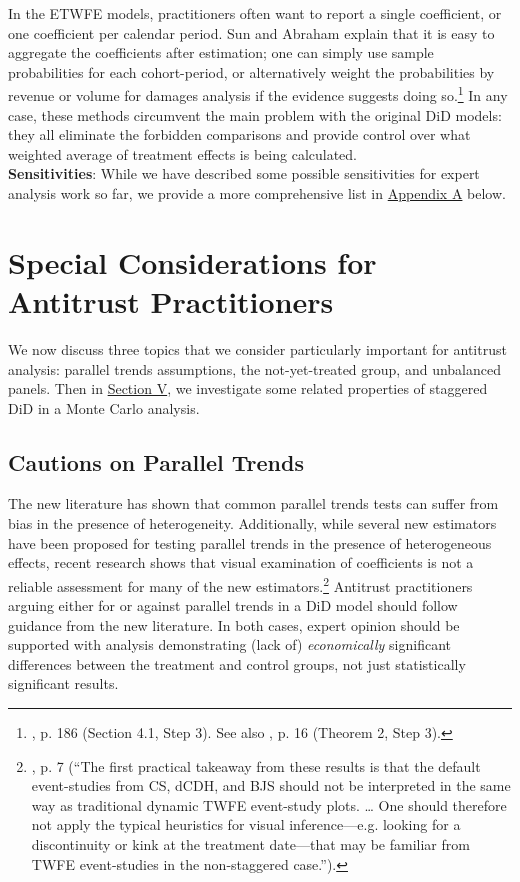 \documentclass[12pt]{article}
\begin{document}
In the ETWFE models, practitioners often want to report a single coefficient, or one coefficient per calendar period. Sun and Abraham explain that it is easy to aggregate the coefficients after estimation; one can simply use sample probabilities for each cohort-period, or alternatively weight the probabilities by revenue or volume for damages analysis if the evidence suggests doing so.\footnote{\citet{sunabr2021a}, p. 186 (Section 4.1, Step 3). See also \citet{borusyak2024revisiting}, p. 16 (Theorem 2, Step 3).}  In any case, these methods circumvent the main problem with the original DiD models: they all eliminate the forbidden comparisons and provide control over what weighted average of treatment effects is being calculated.
\\
\textbf{Sensitivities}: While we have described some possible sensitivities for expert analysis work so far, we provide a more comprehensive list in  \hyperref[sec:appendixa]{Appendix A} below.
\section{Special Considerations for Antitrust Practitioners} \label{sec:antitrust}
We now discuss three topics that we consider particularly important for antitrust analysis: parallel trends assumptions, the not-yet-treated group, and unbalanced panels. Then in  \hyperref[sec:analysis]{Section V}, we investigate some related properties of staggered DiD in a Monte Carlo analysis.
\subsection{Cautions on Parallel Trends} \label{sec:parallel-trends}
The new literature has shown that common parallel trends tests can suffer from bias in the presence of heterogeneity. Additionally, while several new estimators have been proposed for testing parallel trends in the presence of heterogeneous effects, recent research shows that visual examination of coefficients is not a reliable assessment for many of the new estimators.\footnote{\citet{roth2024a}, p. 7 (“The first practical takeaway from these results is that the default event-studies from CS, dCDH, and BJS should not be interpreted in the same way as traditional dynamic TWFE event-study plots. … One should therefore not apply the typical heuristics for visual inference—e.g. looking for a discontinuity or kink at the treatment date—that may be familiar from TWFE event-studies in the non-staggered case.”).}  Antitrust practitioners arguing either for or against parallel trends in a DiD model should follow guidance from the new literature. In both cases, expert opinion should be supported with analysis demonstrating (lack of) \textit{economically} significant differences between the treatment and control groups, not just statistically significant results.
\end{document}
